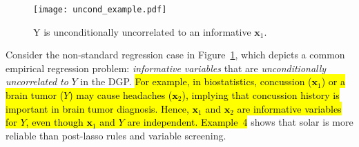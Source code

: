 \documentclass[11pt,review,authoryear]{elsarticle}
\begin{document}
\begin{figure}[h]
%
  \centering
  \texttt{[image: uncond\_example.pdf]}
  \caption{Y is unconditionally uncorrelated to an informative $\mathbf{x}_1$.}
  \label{fig:uncond_example}
%
\end{figure}

Consider the non-standard regression case in Figure~\ref{fig:uncond_example}, which depicts a common empirical regression problem: \emph{informative variables} that are \emph{unconditionally uncorrelated to} $Y$ in the DGP. \hl{For example, in biostatistics, concussion ($\mathbf{x}_1$) or a brain tumor ($Y$) may cause headaches ($\mathbf{x}_2$), implying that concussion history is important in brain tumor diagnosis. Hence, $\mathbf{x}_1$ and $\mathbf{x}_2$ are informative variables for $Y$, even though $\mathbf{x}_1$ and $Y$ are independent. Example~4} shows that solar is more reliable than post-lasso rules and variable screening.
\end{document}
